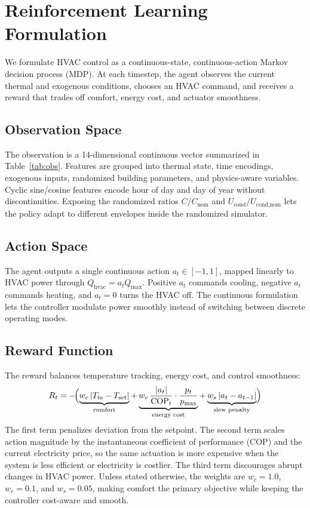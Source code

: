 \documentclass[conference]{IEEEtran}
\newcommand{\acMDP}{Markov decision process (MDP)}
\newcommand{\acCOP}{coefficient of performance (COP)}
\begin{document}
\section{Reinforcement Learning Formulation}
\label{sec:rl-formulation}

We formulate HVAC control as a continuous-state, continuous-action
\acMDP{}. At each timestep, the agent observes the current thermal and
exogenous conditions, chooses an HVAC command, and receives a reward that
trades off comfort, energy cost, and actuator smoothness.




\subsection{Observation Space}
\label{subsec:state-space}

The observation is a 14-dimensional continuous vector summarized in
Table~\ref{tab:obs}. Features are grouped into thermal state, time
encodings, exogenous inputs, randomized building parameters, and
physics-aware variables. Cyclic sine/cosine features encode hour of day
and day of year without discontinuities. Exposing the randomized ratios
$C/C_{\text{nom}}$ and $U_{\text{cond}}/U_{\text{cond,nom}}$ lets the
policy adapt to different envelopes inside the randomized simulator.


\subsection{Action Space}
\label{subsec:action-space}

The agent outputs a single continuous action $a_t \in [-1,1]$, mapped
linearly to HVAC power through $Q_{\text{hvac}} = a_t Q_{\max}$.
Positive $a_t$ commands cooling, negative $a_t$ commands heating, and
$a_t = 0$ turns the HVAC off. The continuous formulation lets the
controller modulate power smoothly instead of switching between discrete
operating modes.

\subsection{Reward Function}
\label{subsec:reward}

The reward balances temperature tracking, energy cost, and control
smoothness:
%
\begin{equation}
\label{eq:reward}
R_t = -\!\Bigl(
\underbrace{w_c \,|T_{\text{in}} - T_{\text{set}}|}_{\text{comfort}}
+ \underbrace{w_e \,\frac{|a_t|}{\text{COP}_t} \cdot \frac{p_t}{p_{\max}}}_{\text{energy cost}}
+ \underbrace{w_s \,|a_t - a_{t-1}|}_{\text{slew penalty}}
\Bigr)
\end{equation}
%
The first term penalizes deviation from the setpoint. The second term
scales action magnitude by the instantaneous \acCOP{} and the current
electricity price, so the same actuation is more expensive when the
system is less efficient or electricity is costlier. The third term
discourages abrupt changes in HVAC power. Unless stated otherwise, the
weights are $w_c = 1.0$, $w_e = 0.1$, and $w_s = 0.05$, making comfort
the primary objective while keeping the controller cost-aware and smooth.
\end{document}
